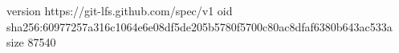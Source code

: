 version https://git-lfs.github.com/spec/v1
oid sha256:60977257a316c1064e6e08df5de205b5780f5700c80ac8dfaf6380b643ac533a
size 87540
